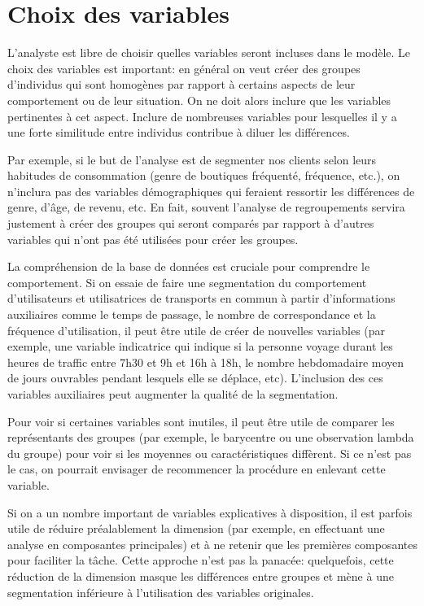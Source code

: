 \documentclass[
  11pt,
  letterpaper,
]{scrbook}
\theoremstyle{definition}
\theoremstyle{remark}
\begin{document}
\section{Choix des variables}\label{choix-des-variables}

L'analyste est libre de choisir quelles variables seront incluses dans
le modèle. Le choix des variables est important: en général on veut
créer des groupes d'individus qui sont homogènes par rapport à certains
aspects de leur comportement ou de leur situation. On ne doit alors
inclure que les variables pertinentes à cet aspect. Inclure de
nombreuses variables pour lesquelles il y a une forte similitude entre
individus contribue à diluer les différences.

Par exemple, si le but de l'analyse est de segmenter nos clients selon
leurs habitudes de consommation (genre de boutiques fréquenté,
fréquence, etc.), on n'inclura pas des variables démographiques qui
feraient ressortir les différences de genre, d'âge, de revenu, etc. En
fait, souvent l'analyse de regroupements servira justement à créer des
groupes qui seront comparés par rapport à d'autres variables qui n'ont
pas été utilisées pour créer les groupes.

La compréhension de la base de données est cruciale pour comprendre le
comportement. Si on essaie de faire une segmentation du comportement
d'utilisateurs et utilisatrices de transports en commun à partir
d'informations auxiliaires comme le temps de passage, le nombre de
correspondance et la fréquence d'utilisation, il peut être utile de
créer de nouvelles variables (par exemple, une variable indicatrice qui
indique si la personne voyage durant les heures de traffic entre 7h30 et
9h et 16h à 18h, le nombre hebdomadaire moyen de jours ouvrables pendant
lesquels elle se déplace, etc). L'inclusion des ces variables
auxiliaires peut augmenter la qualité de la segmentation.

Pour voir si certaines variables sont inutiles, il peut être utile de
comparer les représentants des groupes (par exemple, le barycentre ou
une observation lambda du groupe) pour voir si les moyennes ou
caractéristiques diffèrent. Si ce n'est pas le cas, on pourrait
envisager de recommencer la procédure en enlevant cette variable.

Si on a un nombre important de variables explicatives à disposition, il
est parfois utile de réduire préalablement la dimension (par exemple, en
effectuant une analyse en composantes principales) et à ne retenir que
les premières composantes pour faciliter la tâche. Cette approche n'est
pas la panacée: quelquefois, cette réduction de la dimension masque les
différences entre groupes et mène à une segmentation inférieure à
l'utilisation des variables originales.
\end{document}
